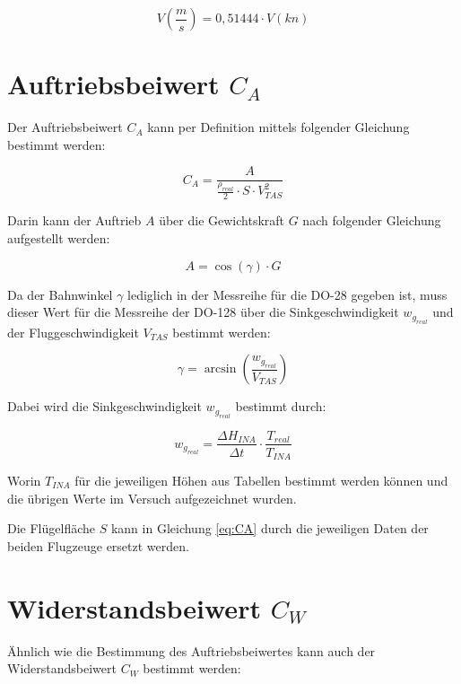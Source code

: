 \begin{equation}
V\left(\frac{m}{s}\right)=0,51444 \cdot V\left(kn\right)
\label{eq:V_Umrechnung}
\end{equation}


\section{Auftriebsbeiwert $C_A$}
\label{sec:CA}

Der Auftriebsbeiwert $C_A$ kann per Definition mittels folgender Gleichung bestimmt werden\cite{Skript}:

\begin{equation}
C_A=\frac{A}{\frac{\rho_{real}}{2} \cdot S \cdot V_{TAS}^2}
\label{eq:CA}
\end{equation}

Darin kann der Auftrieb $A$ über die Gewichtskraft $G$ nach folgender Gleichung aufgestellt werden:

\begin{equation}
A=\cos(\gamma) \cdot G
\label{eq:A}
\end{equation}

Da der Bahnwinkel $\gamma$ lediglich in der Messreihe für die DO-28 gegeben ist, muss dieser Wert für die Messreihe der DO-128 über die Sinkgeschwindigkeit $w_{g_{real}}$ und der Fluggeschwindigkeit $V_{TAS}$ bestimmt werden:

\begin{equation}
\gamma=\arcsin\left(\frac{w_{g_{real}}}{V_{TAS}}\right)
\label{eq:gamma}
\end{equation} 

Dabei wird die Sinkgeschwindigkeit $w_{g_{real}}$ bestimmt durch\cite{Kurzskript}:

\begin{equation}
w_{g_{real}}=\frac{\Delta H_{INA}}{\Delta t} \cdot \frac{T_{real}}{T_{INA}}
\end{equation}

Worin $T_{INA}$ für die jeweiligen Höhen aus Tabellen bestimmt werden können und die übrigen Werte im Versuch aufgezeichnet wurden.

Die Flügelfläche $S$ kann in Gleichung \ref{eq:CA} durch die jeweiligen Daten der beiden Flugzeuge ersetzt werden.

\section{Widerstandsbeiwert $C_W$}

Ähnlich wie die Bestimmung des Auftriebsbeiwertes kann auch der Widerstandsbeiwert $C_W$ bestimmt werden:


